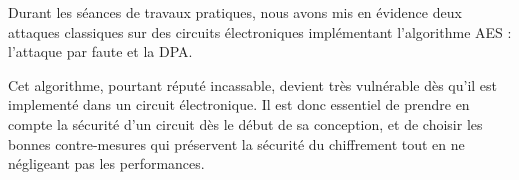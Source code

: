 Durant les séances de travaux pratiques, nous avons mis en évidence
deux attaques classiques sur des circuits électroniques implémentant
l'algorithme AES : l'attaque par faute et la DPA.

Cet algorithme, pourtant réputé incassable, devient très vulnérable 
dès qu'il est implementé dans un circuit électronique.
Il est donc essentiel de prendre en compte la sécurité d'un circuit
dès le début de sa conception, et de choisir les bonnes contre-mesures
qui préservent la sécurité du chiffrement tout en ne négligeant pas
les performances.
